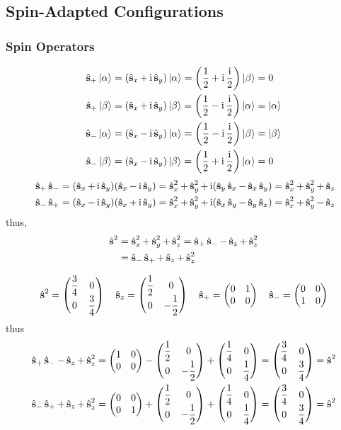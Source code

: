 \documentclass[a4paper]{article}
\begin{document}
\subsection{Spin-Adapted Configurations}
\subsubsection{Spin Operators}
\begin{align}
\hs_+\ket{\alpha} &= (\hs_x + \I\hs_y)\ket{\alpha} = \qty(\dfrac{1}{2} + \I\dfrac{\I}{2})\ket{\beta} = 0\\
\hs_+\ket{\beta} &= (\hs_x + \I\hs_y)\ket{\beta} = \qty(\dfrac{1}{2} - \I\dfrac{\I}{2})\ket{\alpha} = \ket{\alpha}\\
\hs_-\ket{\alpha} &= (\hs_x - \I\hs_y)\ket{\alpha} = \qty(\dfrac{1}{2} - \I\dfrac{\I}{2})\ket{\beta} = \ket{\beta}\\
\hs_-\ket{\beta} &= (\hs_x - \I\hs_y)\ket{\beta} = \qty(\dfrac{1}{2} + \I\dfrac{\I}{2})\ket{\alpha} = 0
\end{align}
\begin{align}
\hs_+\hs_- &= (\hs_x + \I\hs_y)(\hs_x - \I\hs_y) = \hs_x^2 + \hs_y^2 + \I(\hs_y\hs_x - \hs_x\hs_y) = \hs_x^2 + \hs_y^2 + \hs_z\\\
\hs_-\hs_+ &= (\hs_x - \I\hs_y)(\hs_x + \I\hs_y) = \hs_x^2 + \hs_y^2 + \I(\hs_x\hs_y - \hs_y\hs_x) = \hs_x^2 + \hs_y^2 - \hs_z
\end{align}
thus,
\begin{align}
\hs^2 &= \hs_x^2 + \hs_y^2 + \hs_z^2 = \hs_+\hs_- - \hs_z + \hs_z^2\\
&= \hs_-\hs_+ + \hs_z + \hs_z^2
\end{align}

\begin{equation}\label{key}
\hs^2 = \mqty(\dfrac{3}{4} & 0\\ 0 & \dfrac{3}{4}) \quad 
\hs_z = \mqty(\dfrac{1}{2} & 0\\ 0 & -\dfrac{1}{2}) \quad
\hs_+ = \mqty(0 & 1\\ 0 & 0) \quad \hs_- = \mqty(0 & 0\\ 1 & 0)
\end{equation}
thus
\begin{align}
\hs_+\hs_- - \hs_z + \hs_z^2 &= \mqty(1 & 0\\ 0 & 0) - \mqty(\dfrac{1}{2} & 0\\ 0 & -\dfrac{1}{2}) + \mqty(\dfrac{1}{4} & 0\\ 0 & \dfrac{1}{4}) = \mqty(\dfrac{3}{4} & 0\\ 0 & \dfrac{3}{4}) = \hs^2\\
\hs_-\hs_+ + \hs_z + \hs_z^2 &= \mqty(0 & 0\\ 0 & 1) + \mqty(\dfrac{1}{2} & 0\\ 0 & -\dfrac{1}{2}) + \mqty(\dfrac{1}{4} & 0\\ 0 & \dfrac{1}{4}) = \mqty(\dfrac{3}{4} & 0\\ 0 & \dfrac{3}{4}) = \hs^2
\end{align}
\end{document}
